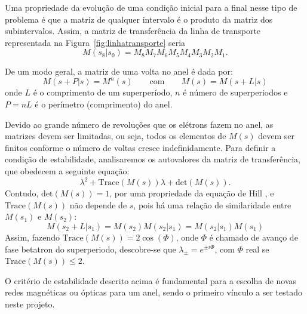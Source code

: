 
Uma propriedade da evolução de uma condição inicial para a final nesse tipo de problema é que a matriz de qualquer intervalo é o produto da matriz dos subintervalos. Assim, a matriz de transferência da linha de transporte representada na \mbox{Figura~\ref{fig:linhatransporte}} seria
\begin{equation}
M(s_8|s_0)=M_8M_7M_6M_5M_4M_3M_2M_1.
\end{equation}

De um modo geral, a matriz de uma volta no anel é dada por:
\begin{displaymath}
 M(s + P|s)=M^n(s)\qquad \mathrm{com} \qquad M(s)=M(s+L|s)
\end{displaymath}
onde $L$ é o comprimento de um superperíodo, $n$ é número de superperiodos e $P=n L$ é o perímetro (comprimento) do anel.

Devido ao grande número de revoluções que os elétrons fazem no anel, as matrizes devem ser limitadas, ou seja, todos os elementos de $M(s)$ devem ser finitos conforme o número de voltas cresce indefinidamente. Para definir a condição de estabilidade, analisaremos os autovalores da matriz de
transferência, que obedecem a seguinte equação:
\begin{equation}
 \lambda^2+\mathrm{Trace}\left(M(s)\right) \lambda +
\mathrm{det}\left(M(s)\right).
\end{equation}
Contudo, $\mathrm{det}\left(M(s)\right)=1$, por uma propriedade da equação de Hill \cite{Lee,Wiedemann3}, e $\mathrm{Trace}\left(M(s)\right)$ não depende de $s$, pois há uma relação de similaridade entre $M(s_1)$ e $M(s_2)$:
\begin{equation} \label{eqsimilaridade}
 M(s_2+L | s_1) = M(s_2) M(s_2 | s_1) = M(s_2 | s_1) M(s_1)
\end{equation}
Assim, fazendo $\mathrm{Trace}\left(M(s)\right)=2 \cos(\Phi)$, onde $\Phi$ é chamado de avanço de fase betatron do superperiodo, descobre-se que $\lambda_\pm = e^{\pm i \Phi}$, com $\Phi$ real se  $\mathrm{Trace}\left(M(s)\right)\leq 2$.

O critério de estabilidade descrito acima é fundamental para a escolha de novas redes magnéticas ou ópticas para um anel, sendo o primeiro vínculo a ser testado neste projeto.
 
